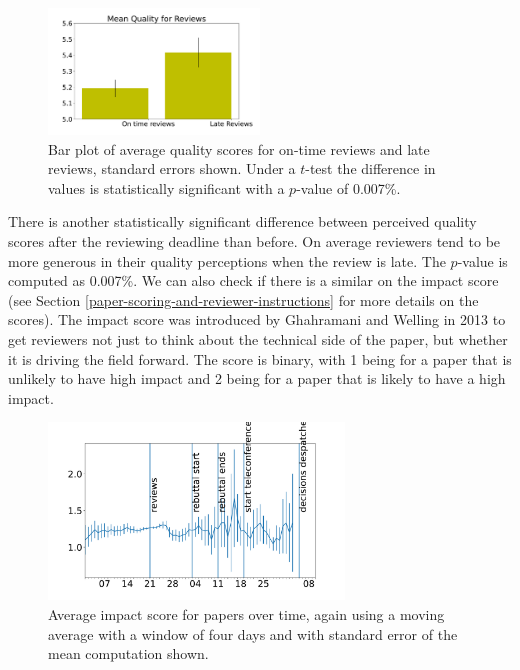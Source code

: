 \begin{figure}[htb]
\centering
\includegraphics[width=0.50\textwidth]{diagrams/neurips/review-quality-early-late.pdf}

\caption{Bar plot of average quality scores for on-time
reviews and late reviews, standard errors shown. Under a \(t\)-test the
difference in values is statistically significant with a \(p\)-value of
0.007\%.} \label{review-quality-early-late}
\end{figure}

There is another statistically significant difference between perceived
quality scores after the reviewing deadline than before. On average
reviewers tend to be more generous in their quality perceptions when the
review is late. The \(p\)-value is computed as 0.007\%. We can also
check if there is a similar on the impact score (see Section \ref{paper-scoring-and-reviewer-instructions} for more details on the scores). The impact score was
introduced by Ghahramani and Welling in 2013 to get reviewers not just to think
about the technical side of the paper, but whether it is driving the
field forward. The score is binary, with 1 being for a paper that is
unlikely to have high impact and 2 being for a paper that is likely to
have a high impact.

\begin{figure}[htb]
\centering
\includegraphics[width=0.70\textwidth]{diagrams/neurips/review-impact-time.pdf}

\caption{Average impact score for papers over time, again using a moving average with a window of four days and with standard error of the mean computation shown.}
\label{review-impact-time}
\end{figure}

